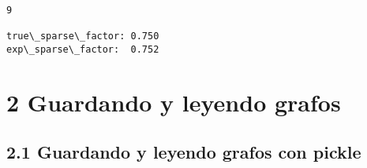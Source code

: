 \documentclass[11pt]{article}
\begin{document}
    \begin{Verbatim}[commandchars=\\\{\}]
9

true\_sparse\_factor: 0.750 
exp\_sparse\_factor:  0.752

    \end{Verbatim}

    \section{2 Guardando y leyendo grafos}\label{guardando-y-leyendo-grafos}

\subsection{2.1 Guardando y leyendo grafos con
pickle}\label{guardando-y-leyendo-grafos-con-pickle}
\end{document}

